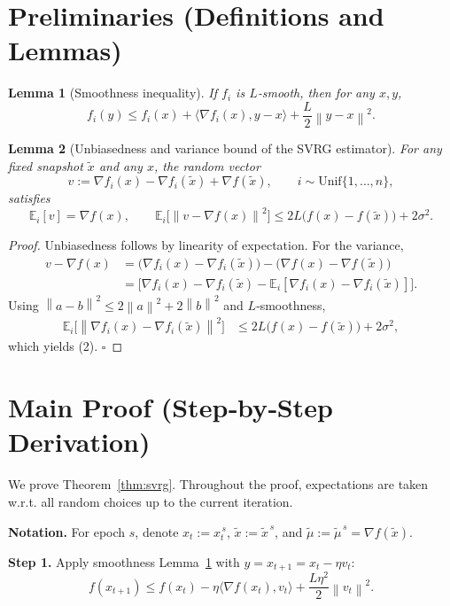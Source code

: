 \documentclass{article}
\newtheorem{lemma}{Lemma}
\newcommand{\EE}{\mathbb{E}}
\newcommand{\norm}[1]{\left\|#1\right\|}
\newcommand{\grad}{\nabla}
\begin{document}
\section*{Preliminaries (Definitions and Lemmas)}
\begin{lemma}[Smoothness inequality]\label{lem:smooth}
If $f_i$ is $L$‑smooth, then for any $x,y$,
\[
f_i(y)\le f_i(x)+\langle\grad f_i(x),y-x\rangle+\frac{L}{2}\norm{y-x}^2 .
\]
\end{lemma}
\begin{lemma}[Unbiasedness and variance bound of the SVRG estimator]\label{lem:vr-bound}
For any fixed snapshot $\tilde{x}$ and any $x$, the random vector
\[
v:=\grad f_{i}(x)-\grad f_{i}(\tilde{x})+\grad f(\tilde{x}),\qquad i\sim\text{Unif}\{1,\dots,n\},
\]
satisfies
\[
\EE_{i}[v]=\grad f(x),\qquad
\EE_{i}\!\bigl[\norm{v-\grad f(x)}^2\bigr]\le 2L\!\bigl(f(x)-f(\tilde{x})\bigr)+2\sigma^2 .
\tag{2}
\]
\end{lemma}
\begin{proof}
Unbiasedness follows by linearity of expectation. For the variance,
\[
\begin{aligned}
v-\grad f(x)
&=\bigl(\grad f_i(x)-\grad f_i(\tilde{x})\bigr)-\bigl(\grad f(x)-\grad f(\tilde{x})\bigr)\\
&= \bigl[\grad f_i(x)-\grad f_i(\tilde{x})-\EE_i[\grad f_i(x)-\grad f_i(\tilde{x})]\bigr].
\end{aligned}
\]
Using $\norm{a-b}^2\le 2\norm{a}^2+2\norm{b}^2$ and $L$‑smoothness,
\[
\begin{aligned}
\EE_i\!\bigl[\norm{\grad f_i(x)-\grad f_i(\tilde{x})}^2\bigr]
&\le 2L\bigl(f(x)-f(\tilde{x})\bigr)+2\sigma^2,
\end{aligned}
\]
which yields (2). \hfill $\square$
\end{proof}

\section*{Main Proof (Step‑by‑Step Derivation)}
We prove Theorem~\ref{thm:svrg}. Throughout the proof, expectations are taken w.r.t. all random choices up to the current iteration.

\medskip
\noindent\textbf{Notation.} For epoch $s$, denote $x_t:=x_t^{\,s}$, $\tilde{x}:=\tilde{x}^{\,s}$, and $\tilde{\mu}:=\tilde{\mu}^{\,s}=\grad f(\tilde{x})$.

\medskip
\noindent\textbf{Step 1.} Apply smoothness Lemma~\ref{lem:smooth} with $y=x_{t+1}=x_t-\eta v_t$:
\[
f(x_{t+1})\le f(x_t)-\eta\langle\grad f(x_t),v_t\rangle+\frac{L\eta^2}{2}\norm{v_t}^2 .
\tag{3}
\]
\end{document}

